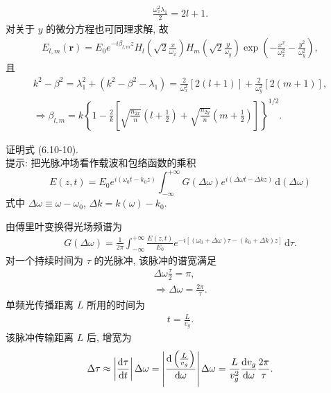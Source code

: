 \documentclass{note}
\begin{document}
\begin{pf}
    \begin{align}
        \frac{\omega_x^2\lambda_1}{2}=2l+1.
    \end{align}
    对关于 $y$ 的微分方程也可同理求解, 故
    \begin{align}
        E_{l,m}(\bm{r})=E_0e^{-i\beta_{l,m}z}H_l\left(\sqrt{2}\frac{x}{\omega_x}\right)H_m\left(\sqrt{2}\frac{y}{\omega_y}\right)\exp\left(-\frac{x^2}{\omega_x^2}-\frac{y^2}{\omega_y^2}\right),
    \end{align}
    且
    \begin{gather}
        k^2-\beta^2=\lambda_1^2+(k^2-\beta^2-\lambda_1)=\frac{2}{\omega_x^2}[2(l+1)]+\frac{2}{\omega_y^2}[2(m+1)],\\
        \Longrightarrow\beta_{l,m}=k\left\{1-\frac{2}{k}\left[\sqrt{\frac{n_{2x}}{n}}\left(l+\frac{1}{2}\right)+\sqrt{\frac{n_{2y}}{n}}\left(m+\frac{1}{2}\right)\right]\right\}^{1/2}.
    \end{gather}
\end{pf}

\begin{exe}
    证明式 (6.10-10).\\
    提示: 把光脉冲场看作载波和包络函数的乘积
    \[
        E(z,t)=E_0e^{i(\omega_0t-k_0z)}\int_{-\infty}^{+\infty}G(\Delta\omega)e^{i(\Delta\omega t-\Delta kz)}\,\mathrm{d}(\Delta\omega)
    \]
    式中 $\Delta\omega\equiv\omega-\omega_0$, $\Delta k=k(\omega)-k_0$.
\end{exe}
\begin{pf}
    由傅里叶变换得光场频谱为
    \begin{align}
        G(\Delta\omega)=\frac{1}{2\pi}\int_{-\infty}^{+\infty}\frac{E(z,t)}{E_0}e^{-i[(\omega_0+\Delta\omega)\tau-(k_0+\Delta k)z]}\,\mathrm{d}\tau.
    \end{align}
    对一个持续时间为 $\tau$ 的光脉冲, 该脉冲的谱宽满足
    \begin{gather}
        \Delta\omega\frac{\tau}{2}=\pi,\\
        \Longrightarrow\Delta\omega=\frac{2\pi}{\tau}.
    \end{gather}
    单频光传播距离 $L$ 所用的时间为
    \begin{align}
        t=\frac{L}{v_g}.
    \end{align}
    该脉冲传输距离 $L$ 后, 增宽为
    \begin{align}
        \Delta\tau\approx\left\lvert\frac{\mathrm{d}\tau}{\mathrm{d}t}\right\rvert\Delta\omega=\left\lvert\frac{\mathrm{d}\left(\frac{L}{v_g}\right)}{\mathrm{d}\omega}\right\rvert\Delta\omega=\frac{L}{v_g^2}\frac{\mathrm{d}v_g}{\mathrm{d}\omega}\frac{2\pi}{\tau}.
    \end{align}
\end{pf}
\end{document}
